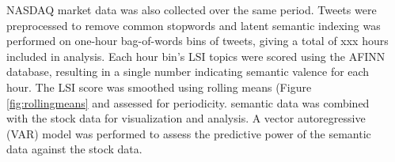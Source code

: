 \documentclass[17pt, a1paper, portrait, margin=0mm, innermargin=10mm,
     blockverticalspace=15mm, colspace=10mm, subcolspace=8mm]{tikzposter} %
\begin{document}
\begin{columns}
{    %
     \begin{tikzfigure} \label{fig:keywords}
     \end{tikzfigure}
     NASDAQ market data was also collected over the same period. Tweets
     were preprocessed to remove common stopwords and latent semantic
     indexing was performed on one-hour bag-of-words bins of tweets,
     giving a total of xxx hours included in analysis. Each hour bin's LSI
     topics were scored using the AFINN database, resulting in a single
     number indicating semantic valence for each hour. The LSI score was
     smoothed using rolling means (Figure \ref{fig:rollingmeans} and
     assessed for periodicity.  semantic data was combined with the stock
     data for visualization and analysis. A vector autoregressive (VAR)
     model was performed to assess the predictive power of the semantic
     data against the stock data.

}
\end{columns}
\end{document}
